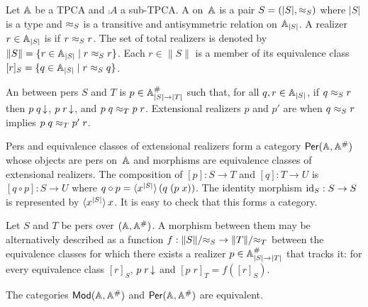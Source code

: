 Let $\AA$ be a TPCA and $\comp{A}$ a sub-TPCA. A  on~$\AA$ is a pair $S = (|S|, {\per_S})$ where
$|S|$ is a type and $\per_S$ is a transitive and antisymmetric
relation on $\xAtyp{S}$. A realizer $r \in \xAtyp{S}$ is  if
$r \per_S r$. The set of total realizers is denoted by $\|S\| = \set{r
  \in \xAtyp{S} \such r \per_S r}$. Each $r \in \|S\|$ is a member of
its equivalence class $[r]_S = \set{q \in \xAtyp{S} \such r \per_S q}$.

An  between pers $S$ and $T$ is $p \in
\compAtyp{|S| \to |T|}$ such that, for all $q, r \in \xAtyp{S}$, if $q
\per_S r$ then $\defined{p\;q}$, $\defined{p\;r}$, and $p\;q \per_T
p\;r$. Extensional realizers $p$ and $p'$ are  when
$q \per_S r$ implies $p\;q \per_T p'\;r$.

Pers and equivalence classes of extensional realizers form a category
$\Per{\AA, \compAA}$ whose objects are pers on~$\AA$ and morphisms are
equivalence classes of extensional realizers. The composition of $[p]
: S \to T$ and $[q] : T \to U$ is $[q \circ p] : S \to U$ where $q
\circ p = \pcalam{\annot{x}{|S|}}{q\;(p\;x)}$. The identity morphism
$\id_S : S \to S$ is represented by $\xpcalam{\annot{x}{|S|}}{x}$. It
is easy to check that this forms a category.

Let $S$ and $T$ be pers over $(\AA, \compAA)$. A morphism between them
may be alternatively described as a function $f : \|S\|/{\per_S} \to
\|T\|/{\per_T}$ between the equivalence classes for which there exists
a realizer $p \in \compAtyp{|S| \to |T|}$ that tracks it: for every
equivalence class $[r]_S$, $\defined{p\;r}$ and $[p\;r]_T = f([r]_S)$.

\begin{proposition}
  The categories $\Mod{\AA, \compAA}$ and $\Per{\AA, \compAA}$ are
  equivalent.
\end{proposition}

